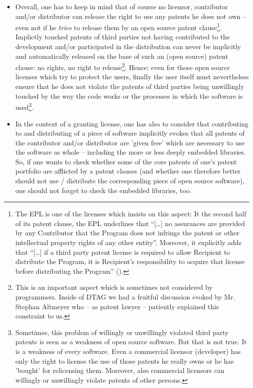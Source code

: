 \begin{itemize}
  
  \item Overall, one has to keep in mind that of course no licensor, contributor
  and/or distributor can release the right to use any patents he does not own --
  even not if he \emph{tries} to release them by an open source patent
  clause\footnote{The EPL is one of the licenses which insists on this aspect:
  It the second half of its patent clause, the EPL underlines that
  \enquote{[\ldots] no assurances are provided by any Contributor that the
  Program does not infringe the patent or other intellectual property rights of
  any other entity}. Moreover, it explicitly adds that \enquote{[\ldots] if a
  third party patent license is required to allow Recipient to distribute the
  Program, it is Recipient's responsibility to acquire that license before
  distributing the Program} (\cite[cf.][\nopage wp.
  §2c]{Epl10OsiLicense2005a}).}. Implictly touched patents of third parties not
  having contributed to the development and/or participated in the distribution
  can never be implicitly and automatically released on the base of such an
  (open source) patent clause: no rights, no right to release\footnote{This is
  an important aspect which is sometimes not considered by programmers. Inside
  of DTAG we had a fruitful discussion evoked by Mr. Stephan Altmeyer who -- as
  patent lawyer -- patiently explained this constraint to us.}. Hence: even for
  those open source licenses which try to protect the users, finally the user
  itself must nevertheless ensure that he does not violate the patents of third
  parties being unwillingly touched by the way the code works or the processes
  in which the software is used\footnote{Sometimes, this problem of willingly or
  unwillingly violated third party patents is seen as a weakness of open source
  software. But that is not true. It is a weakness of every software. Even a
  commercial licensor (developer) has only the right to license the use of those
  patents he really owns or he has 'bought' for relicensing them. Moreover, also
  commercial licensors can willingly or unwillingly violate patents of other
  persons.}.
  
  \item In the context of a granting license, one has also to consider that
  contributing to and distributing of a piece of software implicitly evokes that
  all patents of the contributor and/or distributor are 'given free' which are
  necessary to use the software as whole -- including the more or less deeply
  embedded libraries. So, if one wants to check whether some of the core patents
  of one's patent portfolio are afflicted by a patent clauses (and whether one
  therefore better should not use / distribute the corresponding piece of open
  source software), one should not forget to check the embedded libraries, too.
  

\end{itemize}
